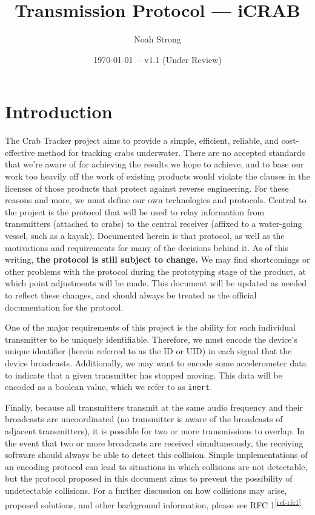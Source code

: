\documentclass[12pt,hidelinks]{article}
\title{Transmission Protocol --- iCRAB}
\author{
	Noah Strong
}
\date{\today\ -- v1.1 (Under Review)}
\newcommand{\fastcite}[1]{\textsuperscript{\ref{#1}}}
\begin{document}
\maketitle

\tableofcontents{}

\newpage

\section{Introduction} \label{introduction}

The Crab Tracker project aims to provide a simple, efficient, reliable, and
cost-effective method for tracking crabs underwater. There are no accepted
standards that we're aware of for achieving the results we hope to achieve,
and to base our work too heavily off the work of existing products would
violate the clauses in the licenses of those products that protect against
reverse engineering.
For these reasons and more, we must define our own technologies and protocols.
Central to the project is the protocol that will be used to relay information
from transmitters (attached to crabs) to the central receiver (affixed to a
water-going vessel, such as a kayak).
Documented herein is that protocol, as well as the motivations and requirements
for many of the decisions behind it.
As of this writing, {\bf the protocol is still subject to change.}
We may find shortcomings or other problems with the protocol during
the prototyping stage of the product, at which point adjustments will be made.
This document will be updated as needed to reflect these changes,
and should always be treated as the official documentation for the protocol.

One of the major requirements of this project is the ability for each
individual transmitter to be uniquely identifiable. Therefore, we must encode
the device's unique identifier (herein referred to as the ID or UID) in each
signal that the device broadcasts.
Additionally, we may want to encode some accelerometer data to indicate that a
given transmitter has stopped moving.
This data will be encoded as a boolean value, which we refer to as
\texttt{inert}.

Finally, because all transmitters transmit at the same audio frequency
and their broadcasts are uncoordinated (no transmitter is aware of the
broadcasts of adjacent transmitters),
it is possible for two or more transmissions to overlap.
In the event that two or more broadcasts are received simultaneously,
the receiving software should always be able to detect this collision.
Simple implementations
of an encoding protocol can lead to situations in which collisions are not
detectable, but the protocol proposed in this document aims to prevent the
possibility of undetectable collisions. For a further discussion on how
collisions may arise, proposed solutions, and other background information,
please see RFC 1\fastcite{ref-rfc1}.
\end{document}
